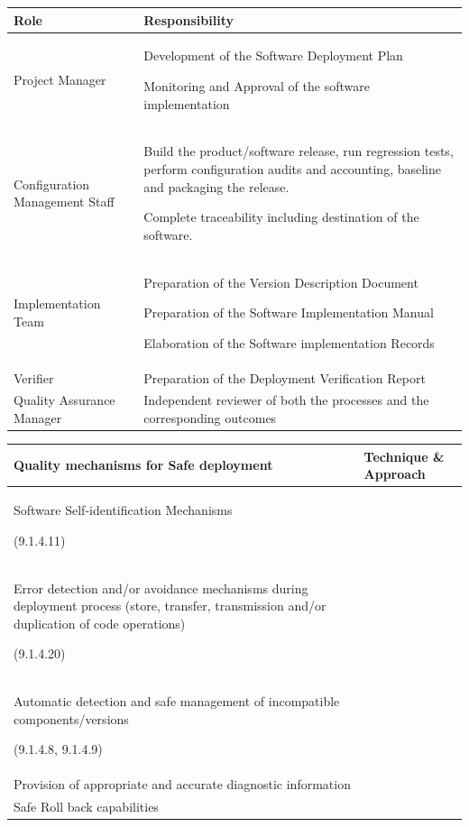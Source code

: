 \documentclass{template/openetcs_article}
\begin{document}
\begin{flushleft}
\tablefirsthead{}
\tablehead{}
\tabletail{}
\tablelasttail{}
\begin{supertabular}{|m{5cm}|m{9cm}|}
\hline
{}
Role &
Responsibility\\\hline
Project Manager &
Development of the Software Deployment Plan

Monitoring and Approval of the software implementation\\\hline
Configuration Management Staff &
Build the product/software release, run regression tests, perform configuration audits and accounting, baseline and packaging the release.

Complete traceability including destination of the software.\\\hline
Implementation Team &
Preparation of the Version Description Document

Preparation of the Software Implementation Manual

Elaboration of the Software implementation Records\\\hline
Verifier &
Preparation of the Deployment Verification Report\\\hline
Quality Assurance Manager &
Independent reviewer of both the processes and the corresponding outcomes\\\hline
\end{supertabular}
\end{flushleft}



\begin{flushleft}
\tablefirsthead{}
\tablehead{}
\tabletail{}
\tablelasttail{}
\begin{supertabular}{|m{7cm}|m{7cm}|}
\hline
{}
Quality mechanisms for Safe deployment &
Technique \& Approach\\\hline
Software Self-identification Mechanisms

(9.1.4.11) &
~
\\\hline
Error detection and/or avoidance mechanisms during deployment process (store, transfer, transmission and/or duplication of code operations)

(9.1.4.20) &
~
\\\hline
Automatic detection and safe management of incompatible components/versions

(9.1.4.8, 9.1.4.9) &
~
\\\hline
Provision of appropriate and accurate diagnostic information &
~
\\\hline
Safe Roll back capabilities  &
~
\\\hline
\end{supertabular}
\end{flushleft}
\end{document}
